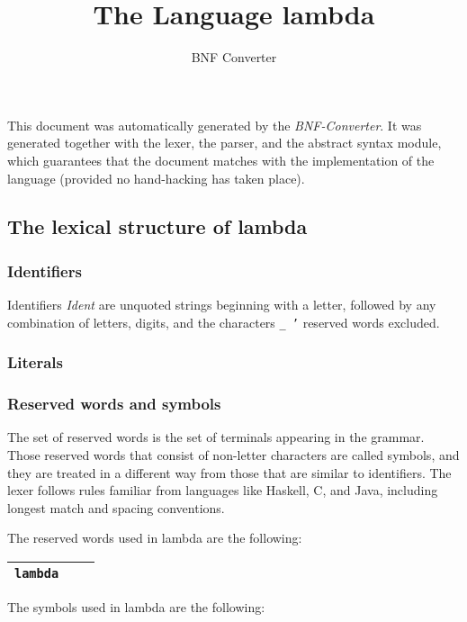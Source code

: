 \documentclass{article}
\title{The Language lambda}
\author{BNF Converter}
\begin{document}
\maketitle
\clearpage


This document was automatically generated by the \textit{BNF-Converter}. It was generated together with the lexer, the parser, and the abstract syntax module, which guarantees that the document matches with the implementation of the language (provided no hand-hacking has taken place).

\subsection*{The lexical structure of lambda}

\subsubsection*{Identifiers}

Identifiers \textit{Ident} are unquoted strings beginning with a letter,
followed by any combination of letters, digits, and the characters \texttt{\_ '}
reserved words excluded.

\subsubsection*{Literals}

\subsubsection*{Reserved words and symbols}

The set of reserved words is the set of terminals appearing in the grammar. Those reserved words that consist of non-letter characters are called symbols, and they are treated in a different way from those that are similar to identifiers. The lexer follows rules familiar from languages like Haskell, C, and Java, including longest match and spacing conventions.

The reserved words used in lambda are the following:

\begin{center}\begin{tabular}{|l|l|l|}
\hline \texttt{lambda} &  &  \\
\hline \end{tabular}\end{center}

The symbols used in lambda are the following:
\end{document}
